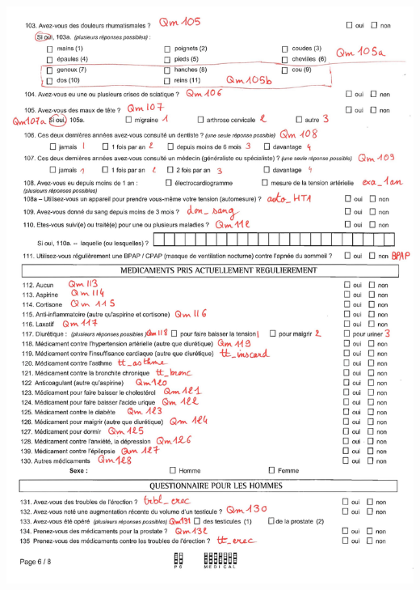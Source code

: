 \documentclass{book}
\begin{document}
\includegraphics[scale=.28]{quest_ipc-6.png}
\newpage
\end{document}
